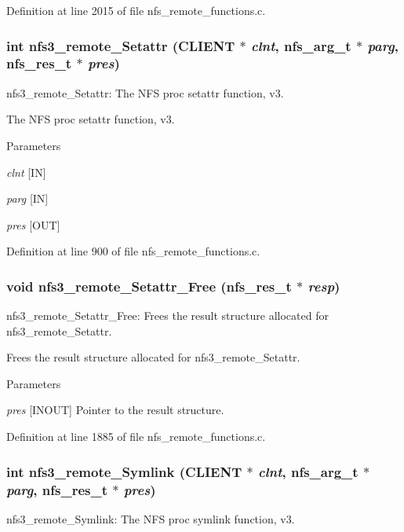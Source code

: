 Definition at line 2015 of file nfs\_\-remote\_\-functions.c.
\subsubsection[{nfs3\_\-remote\_\-Setattr}]{\setlength{\rightskip}{0pt plus 5cm}int nfs3\_\-remote\_\-Setattr (CLIENT $\ast$ {\em clnt}, \/  nfs\_\-arg\_\-t $\ast$ {\em parg}, \/  nfs\_\-res\_\-t $\ast$ {\em pres})}\label{group__NFSprocs_ga42b9b2df48ae1e7dd577ce846fb3e9e9}
nfs3\_\-remote\_\-Setattr: The NFS proc setattr function, v3.

The NFS proc setattr function, v3.


\begin{DoxyParams}{Parameters}
\item[{\em clnt}][IN] \item[{\em parg}][IN] \item[{\em pres}][OUT] \end{DoxyParams}


Definition at line 900 of file nfs\_\-remote\_\-functions.c.
\subsubsection[{nfs3\_\-remote\_\-Setattr\_\-Free}]{\setlength{\rightskip}{0pt plus 5cm}void nfs3\_\-remote\_\-Setattr\_\-Free (nfs\_\-res\_\-t $\ast$ {\em resp})}\label{group__NFSprocs_ga8ac3d130ecc9a7b8a54052269c90f950}
nfs3\_\-remote\_\-Setattr\_\-Free: Frees the result structure allocated for nfs3\_\-remote\_\-Setattr.

Frees the result structure allocated for nfs3\_\-remote\_\-Setattr.


\begin{DoxyParams}{Parameters}
\item[{\em pres}][INOUT] Pointer to the result structure. \end{DoxyParams}


Definition at line 1885 of file nfs\_\-remote\_\-functions.c.
\subsubsection[{nfs3\_\-remote\_\-Symlink}]{\setlength{\rightskip}{0pt plus 5cm}int nfs3\_\-remote\_\-Symlink (CLIENT $\ast$ {\em clnt}, \/  nfs\_\-arg\_\-t $\ast$ {\em parg}, \/  nfs\_\-res\_\-t $\ast$ {\em pres})}\label{group__NFSprocs_gacf367f6d49254f8156b0378a2789ea58}
nfs3\_\-remote\_\-Symlink: The NFS proc symlink function, v3.

